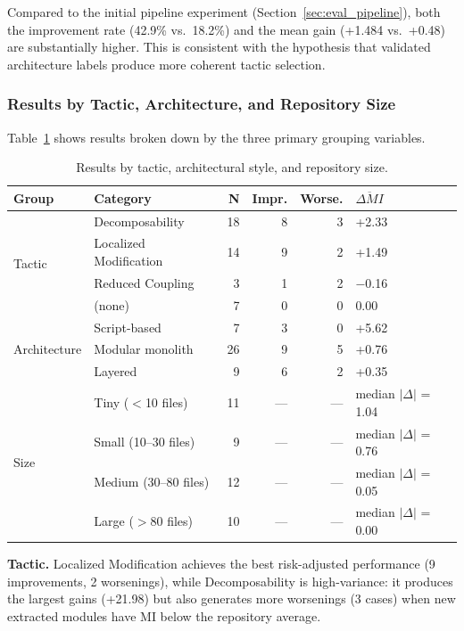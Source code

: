 Compared to the initial pipeline experiment (Section~\ref{sec:eval_pipeline}), both the improvement rate (42.9\% vs.\ 18.2\%) and the mean gain (+1.484 vs.\ +0.48) are substantially higher. This is consistent with the hypothesis that validated architecture labels produce more coherent tactic selection.

\subsubsection*{Results by Tactic, Architecture, and Repository Size}

Table~\ref{tab:exp5_combined} shows results broken down by the three primary grouping variables.

\begin{table}[H]
\centering
\small
\caption{Results by tactic, architectural style, and repository size.}
\label{tab:exp5_combined}
\begin{tabular}{llrrrl}
\toprule
\textbf{Group} & \textbf{Category} & \textbf{N} & \textbf{Impr.} & \textbf{Worse.} & $\overline{\Delta MI}$ \\
\midrule
\multirow{4}{*}{Tactic}
  & Decomposability        & 18 & 8 & 3 & +2.33 \\
  & Localized Modification & 14 & 9 & 2 & +1.49 \\
  & Reduced Coupling       & 3  & 1 & 2 & $-$0.16 \\
  & (none)                 & 7  & 0 & 0 & 0.00 \\
\midrule
\multirow{3}{*}{Architecture}
  & Script-based     & 7  & 3 & 0 & +5.62 \\
  & Modular monolith & 26 & 9 & 5 & +0.76 \\
  & Layered          & 9  & 6 & 2 & +0.35 \\
\midrule
\multirow{4}{*}{Size}
  & Tiny ($<$10 files)    & 11 & — & — & median $|\Delta|$ = 1.04 \\
  & Small (10--30 files)  & 9  & — & — & median $|\Delta|$ = 0.76 \\
  & Medium (30--80 files) & 12 & — & — & median $|\Delta|$ = 0.05 \\
  & Large ($>$80 files)   & 10 & — & — & median $|\Delta|$ = 0.00 \\
\bottomrule
\end{tabular}
\end{table}

\textbf{Tactic.} Localized Modification achieves the best risk-adjusted performance (9 improvements, 2 worsenings), while Decomposability is high-variance: it produces the largest gains (+21.98) but also generates more worsenings (3 cases) when new extracted modules have MI below the repository average.

